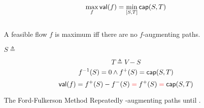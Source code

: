 \begin{frame}{}
  \begin{theorem}
    \[
      \max_{f} \textsf{val}(f) = \min_{[S, T]} \textsf{cap}(S, T)
    \]
    \begin{center}
    \end{center}
  \end{theorem}

  \begin{columns}
      \begin{center}
      \end{center}
      \begin{center}
      \end{center}
  \end{columns}
\end{frame}

\begin{frame}{}
\end{frame}

\begin{frame}{}
  \begin{theorem}
    A feasible flow $f$ is maximum iff there are no $f$-augmenting paths.
  \end{theorem}

  \pause
  \vspace{0.30cm}
  \begin{center}

    \pause
    \vspace{0.30cm}
    $S \triangleq$

    \pause
    \[
      T \triangleq V - S
    \]
    \pause
    \[
        f^{-1}(S) = 0 \land f^{+}(S) = \textsf{cap}(S, T)
    \]
    \pause
    \[
      \textsf{val}(f) = f^{+}(S) - f^{-}(S) \;\textcolor{red}{=}\; f^{+}(S) \;\textcolor{red}{=}\; \textsf{cap}(S, T)
    \]
  \end{center}
\end{frame}

\begin{frame}{}
  \begin{exampleblock}{The Ford-Fulkerson Method}
    Repeatedly  -augmenting paths
    until .
  \end{exampleblock}

  \vspace{0.50cm}
\end{frame}

